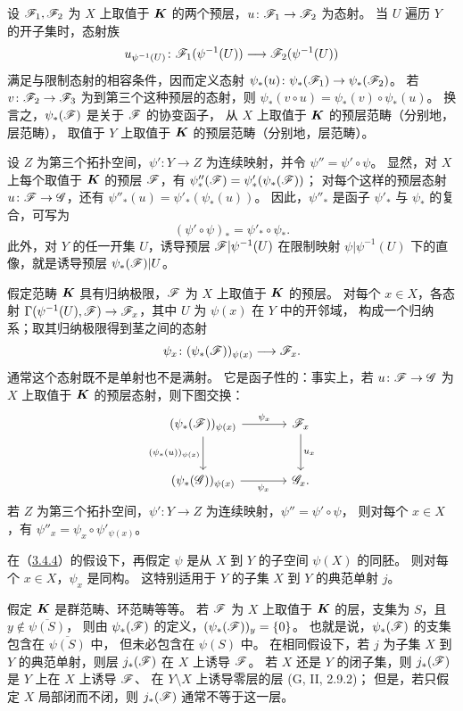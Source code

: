 设 $\mathscr F_1,\mathscr F_2$ 为 $X$ 上取值于 $\boldsymbol K$ 的两个预层，$u\colon\mathscr F_1\to\mathscr F_2$ 为态射。
当 $U$ 遍历 $Y$ 的开子集时，态射族
\[
 u_{\psi^{-1}(U)}\colon\mathscr F_1(\psi^{-1}(U))\longrightarrow\mathscr F_2(\psi^{-1}(U))
\]
满足与限制态射的相容条件，因而定义态射
$\psi_*(u)\colon\psi_*(\mathscr F_1)\to\psi_*(\mathscr F_2)$。
若 $v\colon\mathscr F_2\to\mathscr F_3$ 为到第三个这种预层的态射，则
$\psi_*(v\circ u)=\psi_*(v)\circ\psi_*(u)$。
换言之，$\psi_*(\mathscr F)$ 是关于 $\mathscr F$ 的协变函子，
从 $X$ 上取值于 $\boldsymbol K$ 的预层范畴（分别地，层范畴），
取值于 $Y$ 上取值于 $\boldsymbol K$ 的预层范畴（分别地，层范畴）。

设 $Z$ 为第三个拓扑空间，$\psi'\colon Y\to Z$ 为连续映射，并令 $\psi''=\psi'\circ\psi$。
显然，对 $X$ 上每个取值于 $\boldsymbol K$ 的预层 $\mathscr F$，有
$\psi''_*(\mathscr F)=\psi'_*(\psi_*(\mathscr F))$；
对每个这样的预层态射 $u\colon\mathscr F\to\mathscr G$，还有
$\psi''_*(u)=\psi'_*(\psi_*(u))$。
因此，$\psi''_*$ 是函子 $\psi'_*$ 与 $\psi_*$ 的复合，可写为
\[
 (\psi'\circ\psi)_*=\psi'_*\circ\psi_*.
\]
此外，对 $Y$ 的任一开集 $U$，诱导预层 $\mathscr F|\psi^{-1}(U)$
在限制映射 $\psi|\psi^{-1}(U)$ 下的直像，就是诱导预层 $\psi_*(\mathscr F)|U$。

假定范畴 $\boldsymbol K$ 具有归纳极限，$\mathscr F$ 为 $X$ 上取值于 $\boldsymbol K$ 的预层。
对每个 $x\in X$，各态射
$\Gamma(\psi^{-1}(U),\mathscr F)\to\mathscr F_x$，其中 $U$ 为 $\psi(x)$ 在 $Y$ 中的开邻域，
构成一个归纳系；取其归纳极限得到茎之间的态射
\[
 \psi_x\colon(\psi_*(\mathscr F))_{\psi(x)}\longrightarrow\mathscr F_x.
\]
通常这个态射既不是单射也不是满射。
它是函子性的：事实上，若 $u\colon\mathscr F\to\mathscr G$ 为 $X$ 上取值于 $\boldsymbol K$ 的预层态射，则下图交换：
\[
\begin{tikzcd}[column sep=large,row sep=large]
 (\psi_*(\F))_{\psi(x)} \arrow[r,"\psi_x"] \arrow[d,"(\psi_*(u))_{\psi(x)}"']
 & \F_x \arrow[d,"u_x"]\\
 (\psi_*(\G))_{\psi(x)} \arrow[r,"\psi_x"'] & \G_x.
\end{tikzcd}
\]
若 $Z$ 为第三个拓扑空间，$\psi'\colon Y\to Z$ 为连续映射，$\psi''=\psi'\circ\psi$，
则对每个 $x\in X$，有 $\psi''_x=\psi_x\circ\psi'_{\psi(x)}$。

在（\hyperlink{para:0:3.4.4}{3.4.4}）的假设下，再假定 $\psi$ 是从 $X$ 到 $Y$ 的子空间 $\psi(X)$ 的同胚。
则对每个 $x\in X$，$\psi_x$ 是同构。
这特别适用于 $Y$ 的子集 $X$ 到 $Y$ 的典范单射 $j$。

假定 $\boldsymbol K$ 是群范畴、环范畴等等。
若 $\mathscr F$ 为 $X$ 上取值于 $\boldsymbol K$ 的层，支集为 $S$，且 $y\notin\overline{\psi(S)}$，
则由 $\psi_*(\mathscr F)$ 的定义，$(\psi_*(\mathscr F))_y=\{0\}$。
也就是说，$\psi_*(\mathscr F)$ 的支集包含在 $\overline{\psi(S)}$ 中，
但未必包含在 $\psi(S)$ 中。
在相同假设下，若 $j$ 为子集 $X$ 到 $Y$ 的典范单射，则层 $j_*(\mathscr F)$ 在 $X$ 上诱导 $\mathscr F$。
若 $X$ 还是 $Y$ 的闭子集，则 $j_*(\mathscr F)$ 是 $Y$ 上在 $X$ 上诱导 $\mathscr F$、
在 $Y\setminus X$ 上诱导零层的层 (G, II, 2.9.2)；
但是，若只假定 $X$ 局部闭而不闭，则 $j_*(\mathscr F)$ 通常不等于这一层。

